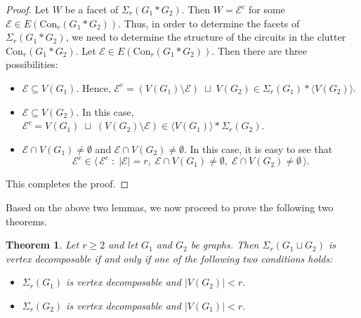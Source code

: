 \documentclass[12pt,reqno]{amsart}
\newtheorem{theorem}[proposition]{Theorem}
\theoremstyle{definition}
\newcommand{\Con}{{\mathrm{Con}}}
\def\E{\mathcal{E}}
\begin{document}
	\begin{proof}
		Let $W$ be a facet of $\Sigma_r(G_1 * G_2)$. Then $W=\E^c$ for some $\E \in E(\Con_r(G_1*G_2))$. Thus, in order to determine the facets of $\Sigma_r(G_1 * G_2)$, we need to determine the structure of the circuits in the clutter $\Con_r(G_1*G_2)$. 
        Let $\E \in E(\Con_r(G_1*G_2))$. Then there are three possibilities:
		
		\begin{itemize}
			\item $\E \subseteq V(G_1)$. Hence, $		\E^c=(V(G_1)\setminus \E)\;\sqcup\; V(G_2)\in \Sigma_r(G_1)*\langle V(G_2)\rangle.$
			
			\item $\E \subseteq V(G_2)$. In this case, $\E^c=V(G_1)\;\sqcup\; (V(G_2)\setminus \E)\in \langle V(G_1)\rangle* \Sigma_r(G_2)$.
			
			\item $\E\cap V(G_1)\neq\emptyset$ and $\E\cap V(G_2)\neq\emptyset$. In this case, it is easy to see that \[\E^c\in \big\langle\, \E^c \;:\; |\E|=r,\; \E \cap V(G_1)\neq\emptyset,\; \E \cap V(G_2)\neq\emptyset \,\big\rangle. 
			\]
		\end{itemize}
        This completes the proof.
\end{proof}

Based on the above two lemmas, we now proceed to prove the following two theorems.

	\begin{theorem}\label{disjoint union vd}
		Let $r \geq 2$ and let $G_1$ and $G_2$ be graphs.  
		Then $\Sigma_r(G_1 \sqcup G_2)$ is vertex decomposable if and only if one of the following two conditions holds:
		\begin{itemize}
			\item $\Sigma_r(G_1)$ is vertex decomposable and $|V(G_2)| < r$.
			
			\item $\Sigma_r(G_2)$ is vertex decomposable and $|V(G_1)| < r$.
		\end{itemize}  
	\end{theorem}
	
\end{document}
